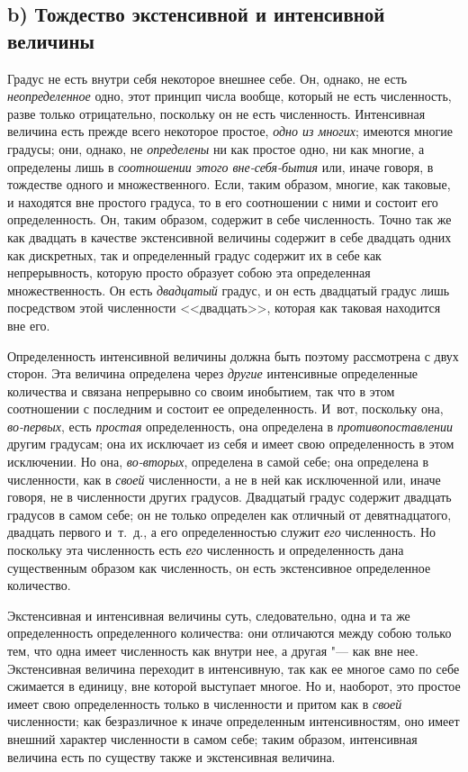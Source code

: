 \subsection[b) Тождество экстенсивной и интенсивной величины]{b) Тождество экстенсивной и интенсивной величины}

Градус не есть внутри себя некоторое внешнее себе. Он, однако, не есть
{\em неопределенное} одно, этот принцип числа вообще,
который не есть численность, разве только отрицательно, поскольку он не
есть численность. Интенсивная величина есть прежде всего некоторое простое,
{\em одно из многих}; имеются многие градусы; они,
однако, не {\em определены} ни как простое одно, ни как
многие, а определены лишь в {\em соотношении этого
вне-себя-бытия} или, иначе говоря, в тождестве одного и множественного.
Если, таким образом, многие, как таковые, и находятся вне простого градуса,
то в его соотношении с ними и состоит его определенность. Он, таким
образом, содержит в себе численность. Точно так же как двадцать в качестве
экстенсивной величины содержит в себе двадцать одних как дискретных, так и
определенный градус содержит их в себе как непрерывность, которую просто
образует собою эта определенная множественность. Он есть
{\em двадцатый} градус, и он есть двадцатый градус лишь
посредством этой численности <<двадцать>>, которая как таковая находится вне
его.

Определенность интенсивной величины должна быть поэтому рассмотрена с двух
сторон. Эта величина определена через {\em другие}
интенсивные определенные количества и связана непрерывно со своим
инобытием, так что в этом соотношении с последним и состоит ее
определенность. И~вот, поскольку она, {\em во-первых},
есть {\em простая} определенность, она определена в
{\em противопоставлении} другим градусам; она их
исключает из себя и имеет свою определенность в этом исключении. Но она,
{\em во-вторых}, определена в самой себе; она
определена в численности, как в {\em своей}
численности, а не в ней как исключенной или, иначе говоря, не в численности
других градусов. Двадцатый градус содержит двадцать градусов в самом себе;
он не только определен как отличный от девятнадцатого, двадцать первого
и~т.~д., а его определенностью служит {\em его}
численность. Но поскольку эта численность есть
{\em его} численность и определенность дана
существенным образом как численность, он есть экстенсивное определенное
количество.

Экстенсивная и интенсивная величины суть, следовательно, одна и та же
определенность определенного количества: они отличаются между собою только
тем, что одна имеет численность как внутри нее, а другая "--- как вне нее.
Экстенсивная величина переходит в интенсивную, так как ее многое само по
себе сжимается в единицу, вне которой выступает многое. Но и, наоборот, это
простое имеет свою определенность только в численности и притом как в
{\em своей} численности; как безразличное к иначе
определенным интенсивностям, оно имеет внешний характер численности в самом
себе; таким образом, интенсивная величина есть по существу также и
экстенсивная величина.

